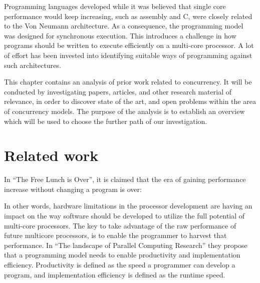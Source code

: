 Programming languages developed while it was believed that single core performance would keep increasing, such as assembly and C, were closely related to the Von Neumann architecture. As a consequence, the programming model was designed for synchronous execution. This introduces a challenge in how programs should be written to execute efficiently on a multi-core processor. A lot of effort has been invested into identifying suitable ways of programming against such architectures\cite{shavit1997software}\cite{haller2007actors}\cite{hewitt2014actor}\cite{scherer2005advanced}. 

This chapter contains an analysis of prior work related to concurrency. It will be conducted by investigating papers, articles, and other research material of relevance, in order to discover state of the art, and open problems within the area of concurrency models. The purpose of the analysis is to establish an overview which will be used to choose the further path of our investigation.
\label{chap:preliminary_analysis}

\section{Related work}

In ``The Free Lunch is Over''\cite{sutter2005free}, it is claimed that the era of gaining performance increase without changing a program is over:


In other words, hardware limitations in the processor development are having an impact on the way software should be developed to utilize the full potential of multi-core processors. The key to take advantage of the raw performance of future multicore processors, is to enable the programmer to harvest that performance\cite[p. 31]{asanovic2006landscape}. In ``The landscape of Parallel Computing Research''\cite{asanovic2006landscape} they propose that a programming model needs to enable productivity and implementation efficiency\cite[p. 31]{asanovic2006landscape}. Productivity is defined as the speed a programmer can develop a program, and implementation efficiency is defined as the runtime speed.

